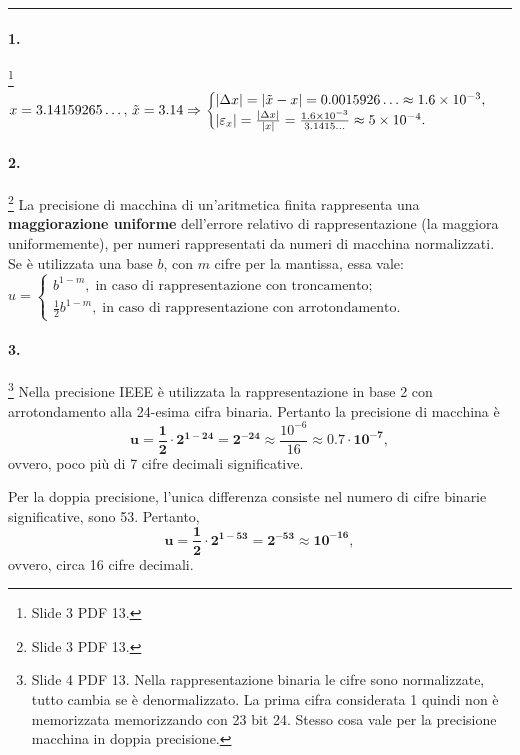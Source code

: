 \hrule

\paragraph{1.}\footnote{Slide 3 PDF 13.} $x = 3.14159265\hdots,\, \Tilde{x}=3.14\Rightarrow\begin{cases}
	|\Delta x|=|\Tilde{x}-x|=0.0015926\hdots\approx 1.6\times 10^{-3},\\
	|\varepsilon_x|=\frac{|\Delta x|}{|x|}=\frac{1.6\times 10^{-3}}{3.1415\hdots}\approx 5\times 10^{-4}.
\end{cases}$

\paragraph{2.}\footnote{Slide 3 PDF 13.} La precisione di macchina di un'aritmetica finita rappresenta una \textbf{maggiorazione uniforme} dell'errore relativo di rappresentazione (la  \gls{maggiora uniformemente}), per numeri rappresentati da numeri di macchina normalizzati. Se è utilizzata una base $b$, con $m$ cifre per la mantissa, essa vale: $u=\begin{cases}
	b^{1-m},\;\text{in caso di rappresentazione con troncamento};\\
	\frac{1}{2}b^{1-m},\;\text{in caso di rappresentazione con arrotondamento.}
\end{cases}$

\paragraph{3.}\footnote{Slide 4 PDF 13. Nella rappresentazione binaria le cifre sono normalizzate, tutto cambia se è denormalizzato. La prima cifra considerata 1 quindi non è memorizzata memorizzando con 23 bit 24. Stesso cosa vale per la precisione macchina in doppia precisione.} Nella precisione IEEE è utilizzata la rappresentazione in base 2 con arrotondamento alla 24-esima cifra binaria. Pertanto la precisione di macchina è
\begin{equation*}
	\boldsymbol{u=\frac{1}{2}\cdot 2^{1-24}=2^{-24}}\approx\frac{10^{-6}}{16}\approx\boldsymbol{0.7\cdot 10^{-7}},
\end{equation*}
ovvero, poco più di 7 cifre decimali significative.

\noindent Per la doppia precisione, l'unica differenza consiste nel numero di cifre binarie significative, sono 53. Pertanto, 
\begin{equation*}
	\boldsymbol{u=\frac{1}{2}\cdot 2^{1-53}=2^{-53}\approx 10^{-16}},
\end{equation*}
ovvero, circa 16 cifre decimali.

